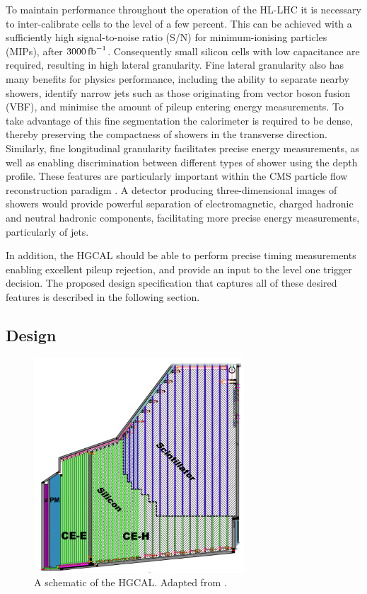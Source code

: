 To maintain performance throughout the operation of the HL-LHC it is necessary to inter-calibrate cells to the level of a few percent. 
This can be achieved with a sufficiently high signal-to-noise ratio (S/N) for minimum-ionising particles (MIPs), after $\SI{3000}{\ensuremath{\textrm{fb}^{-1}}}$.
Consequently small silicon cells with low capacitance are required, resulting in high lateral granularity. 
Fine lateral granularity also has many benefits for physics performance, including the ability to separate nearby showers, 
identify narrow jets such as those originating from vector boson fusion (VBF), and minimise the amount of pileup entering energy measurements. 
To take advantage of this fine segmentation the calorimeter is required to be dense, thereby preserving the compactness of showers in the transverse direction.
Similarly, fine longitudinal granularity facilitates precise energy measurements, as well as enabling discrimination between different types of shower using the depth profile.
These features are particularly important within the CMS particle flow reconstruction paradigm \cite{ParticleFlow}. 
A detector producing three-dimensional images of showers would provide powerful separation of electromagnetic, charged hadronic and neutral hadronic components, 
facilitating more precise energy measurements, particularly of jets. 

In addition, the HGCAL should be able to perform precise timing measurements enabling excellent pileup rejection, and provide an input to the level one trigger decision. 
The proposed design specification that captures all of these desired features is described in the following section. 

\subsection{Design}

\begin{figure}[h!]
\begin{centering}
\includegraphics[width=0.7\textwidth]{Figures/HGCAL/TheHGCAL.png}
\caption{A schematic of the HGCAL. Adapted from \cite{HGCAL}.}
\label{fig:TheHGCAL}
\end{centering}
\end{figure}

